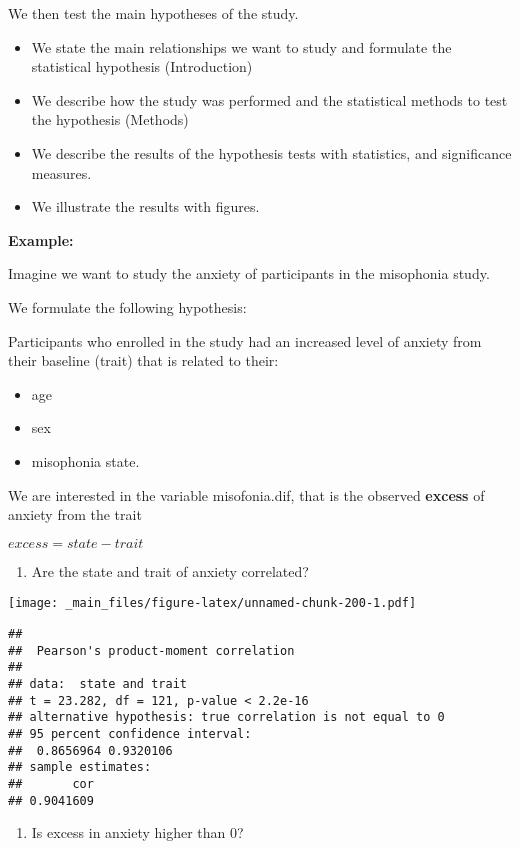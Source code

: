 \documentclass[
]{book}
\providecommand{\tightlist}{%
  \setlength{\itemsep}{0pt}\setlength{\parskip}{0pt}}
\begin{document}
We then test the main hypotheses of the study.

\begin{itemize}
\item
  We state the main relationships we want to study and formulate the statistical hypothesis (Introduction)
\item
  We describe how the study was performed and the statistical methods to test the hypothesis (Methods)
\item
  We describe the results of the hypothesis tests with statistics, and significance measures.
\item
  We illustrate the results with figures.
\end{itemize}

\textbf{Example:}

Imagine we want to study the anxiety of participants in the misophonia study.

We formulate the following hypothesis:

Participants who enrolled in the study had an increased level of anxiety from their baseline (trait) that is related to their:

\begin{itemize}
\tightlist
\item
  age
\item
  sex
\item
  misophonia state.
\end{itemize}

We are interested in the variable misofonia.dif, that is the observed \textbf{excess} of anxiety from the trait

\(excess = state - trait\)

\begin{enumerate}
\def\labelenumi{\arabic{enumi}.}
\tightlist
\item
  Are the state and trait of anxiety correlated?
\end{enumerate}

\texttt{[image: \_main\_files/figure-latex/unnamed-chunk-200-1.pdf]}

\begin{verbatim}
## 
##  Pearson's product-moment correlation
## 
## data:  state and trait
## t = 23.282, df = 121, p-value < 2.2e-16
## alternative hypothesis: true correlation is not equal to 0
## 95 percent confidence interval:
##  0.8656964 0.9320106
## sample estimates:
##       cor 
## 0.9041609
\end{verbatim}

\begin{enumerate}
\def\labelenumi{\arabic{enumi}.}
\setcounter{enumi}{1}
\tightlist
\item
  Is excess in anxiety higher than \(0\)?
\end{enumerate}
\end{document}
